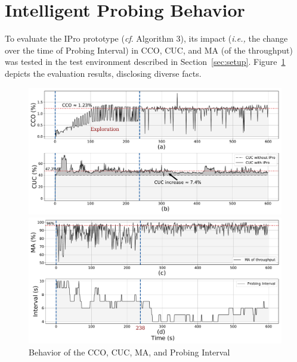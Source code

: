 \section{Intelligent Probing Behavior}
\label{sec:ipro_behavior}

To evaluate the IPro prototype (\textit{cf}. Algorithm 3), its impact (\textit{i.e.,} the change over the time of Probing Interval) in CCO, CUC, and MA (of the throughput) was tested in the test environment described in Section~\ref{sec:setup}. Figure~\ref{fig:load_behavior} depicts the evaluation results, disclosing diverse facts.

\begin{figure}[h!]
\centering
        \begin{minipage}[t]{1.0\textwidth}
            \centering
            \includegraphics[width=\textwidth]{figures/Figure12a-IPro-behavior-MA-CCO-CUC}
        \end{minipage}
        \hfill
        \begin{minipage}[t]{1.0\textwidth}
            \centering
            \includegraphics[width=\textwidth]{figures/Figure12b-IPro-behavior-MA-CCO-CUC}
        \end{minipage}
        \vspace{-0.5cm}
        \caption{Behavior of the CCO, CUC, MA, and Probing Interval}
        \label{fig:load_behavior}
\end{figure}

